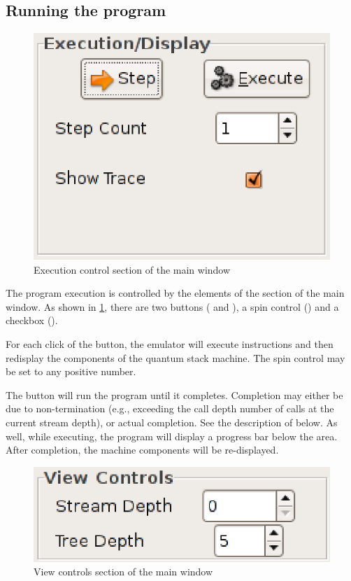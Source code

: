 \subsection{Running the program}

\begin{figure}[htbp]
\centering
\includegraphics[scale=.8]{images/emulator/ExecutionDisplay.eps}
\caption{Execution control section of the main window}\label{fig:emexecdisplay}
\end{figure}

The program execution is controlled by the elements of the 
 section of the main window. As shown in 
\ref{fig:emexecdisplay}, there are two buttons ( and
), a spin control () and a 
checkbox ().

For each click of the  button, the emulator will execute
\emph{} instructions and then redisplay the 
components of the quantum stack machine. The spin control may be set to 
any positive number.

The  button will run the program until it completes. 
Completion may either be due to non-termination (e.g., exceeding the call
depth number of calls at the current stream depth), or actual completion.
See the  description of  below.
As well, while executing, the program will display a progress bar below the
 area.  After completion, the machine components will
be re-displayed.

\begin{figure}[htbp]
\centering
\includegraphics[scale=.8]{images/emulator/ViewControls.eps}
\caption{View controls section of the main window}\label{fig:emviewcontrols}
\end{figure}

